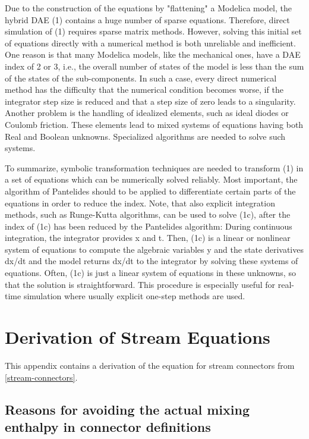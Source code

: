 \documentclass[10pt,a4paper]{report}
\def\doublelabel#1{\label{#1}}
\begin{document}
Due to the construction of the equations by "flattening" a Modelica
model, the hybrid DAE (1) contains a huge number of sparse equations.
Therefore, direct simulation of (1) requires sparse matrix methods.
However, solving this initial set of equations directly with a numerical
method is both unreliable and inefficient. One reason is that many
Modelica models, like the mechanical ones, have a DAE index of 2 or 3,
i.e., the overall number of states of the model is less than the sum of
the states of the sub-components. In such a case, every direct numerical
method has the difficulty that the numerical condition becomes worse, if
the integrator step size is reduced and that a step size of zero leads
to a singularity. Another problem is the handling of idealized elements,
such as ideal diodes or Coulomb friction. These elements lead to mixed
systems of equations having both Real and Boolean unknowns. Specialized
algorithms are needed to solve such systems.

To summarize, symbolic transformation techniques are needed to transform
(1) in a set of equations which can be numerically solved reliably. Most
important, the algorithm of Pantelides should to be applied to
differentiate certain parts of the equations in order to reduce the
index. Note, that also explicit integration methods, such as Runge-Kutta
algorithms, can be used to solve (1c), after the index of (1c) has been
reduced by the Pantelides algorithm: During continuous integration, the
integrator provides x and t. Then, (1c) is a linear or nonlinear system
of equations to compute the algebraic variables y and the state
derivatives dx/dt and the model returns dx/dt to the integrator by
solving these systems of equations. Often, (1c) is just a linear system
of equations in these unknowns, so that the solution is straightforward.
This procedure is especially useful for real-time simulation where
usually explicit one-step methods are used.

\chapter{Derivation of Stream Equations}\doublelabel{derivation-of-stream-equations}

This appendix contains a derivation of the equation for stream
connectors from \ref{stream-connectors}.

\section{Reasons for avoiding the actual mixing enthalpy in connector definitions}\doublelabel{reasons-for-avoiding-the-actual-mixing-enthalpy-in-connector-definitions}
\end{document}
